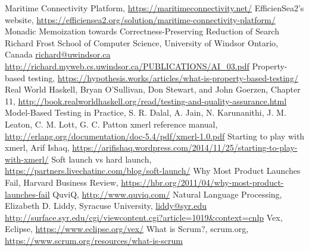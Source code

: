 \begin{thebibliography}{9}
		Maritime Connectivity Platform,
		\url{https://maritimeconnectivity.net/}
		EfficienSea2's website,
		\url{https://efficiensea2.org/solution/maritime-connectivity-platform/}
		Monadic Memoization towards Correctness-Preserving Reduction of Search
		Richard Frost
		School of Computer Science, University of Windsor
		Ontario, Canada
		\url{richard@uwindsor.ca}
		\url{http://richard.myweb.cs.uwindsor.ca/PUBLICATIONS/AI_03.pdf}
		Property-based testing,
		\url{https://hypothesis.works/articles/what-is-property-based-testing/}
		Real World Haskell,
		Bryan O'Sullivan, Don Stewart, and John Goerzen,
		Chapter 11,
		\url{http://book.realworldhaskell.org/read/testing-and-quality-assurance.html}
		Model-Based Testing in Practice,
		S. R. Dalal, A. Jain, N. Karunanithi,
		J. M. Leaton, C. M. Lott, G. C. Patton
		xmerl reference manual,
		\url{http://erlang.org/documentation/doc-5.4/pdf/xmerl-1.0.pdf}
		Starting to play with xmerl,
		Arif Ishaq,
		\url{https://arifishaq.wordpress.com/2014/11/25/starting-to-play-with-xmerl/}
		Soft launch vs hard launch,
		\url{https://partners.livechatinc.com/blog/soft-launch/}
		Why Most Product Launches Fail,
		Harvard Business Review,
		\url{https://hbr.org/2011/04/why-most-product-launches-fail}
		QuviQ,
		\url{http://www.quviq.com/}
		Natural Language Processing,
		Elizabeth D. Liddy,
		Syracuse University,
		\url{liddy@syr.edu}
		\url{http://surface.syr.edu/cgi/viewcontent.cgi?article=1019&context=cnlp}
		Vex,
		Eclipse,
		\url{https://www.eclipse.org/vex/}
		What is Scrum?,
		scrum.org,
		\url{https://www.scrum.org/resources/what-is-scrum}
\end{thebibliography}